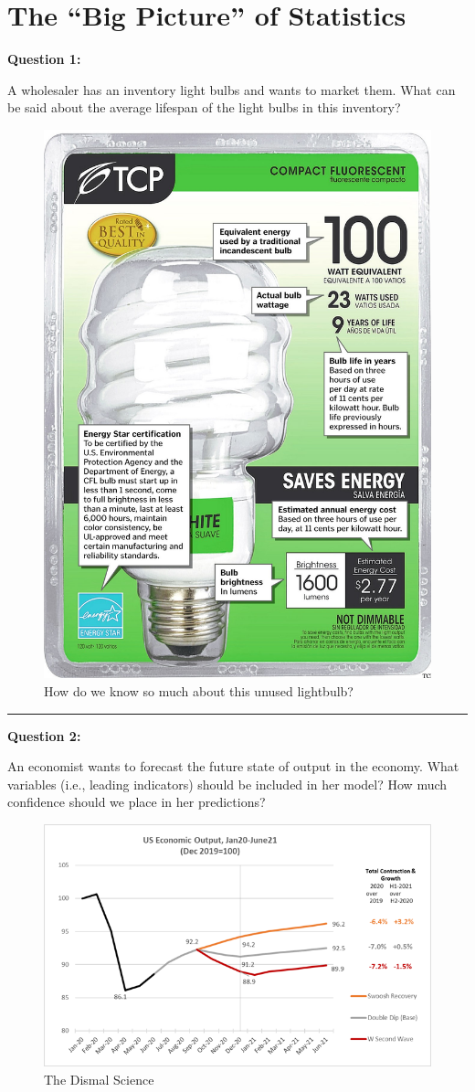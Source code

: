 \documentclass[
]{book}
\begin{document}
\section{The ``Big Picture'' of Statistics}\label{the-big-picture-of-statistics}

\textbf{Question 1:}

A wholesaler has an inventory light bulbs and wants to market them. What can be said about the average lifespan of the light bulbs in this inventory?

\begin{figure}

{\centering \includegraphics[width=0.5\linewidth]{images/BULB} 

}

\caption{How do we know so much about this unused lightbulb?}\label{fig:unnamed-chunk-3}
\end{figure}

\begin{center}\rule{0.5\linewidth}{0.5pt}\end{center}

\textbf{Question 2:}

An economist wants to forecast the future state of output in the economy. What variables (i.e., leading indicators) should be included in her model? How much confidence should we place in her predictions?

\begin{figure}

{\centering \includegraphics[width=0.8\linewidth]{images/ECONOMIC} 

}

\caption{The Dismal Science}\label{fig:unnamed-chunk-4}
\end{figure}
\end{document}
